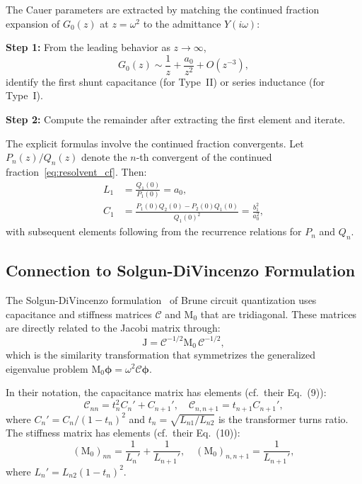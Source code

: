 \documentclass[reprint, floatfix, superscriptaddress, amsmath, amssymb, longbibliography]{revtex4-2}
\begin{document}
The Cauer parameters are extracted by matching the continued fraction expansion of $G_0(z)$ at $z = \omega^2$ to the admittance $Y(i\omega)$:

\textbf{Step 1:} From the leading behavior as $z \to \infty$,
\begin{equation}
G_0(z) \sim \frac{1}{z} + \frac{a_0}{z^2} + O(z^{-3}),
\label{eq:G_asymptotic}
\end{equation}
identify the first shunt capacitance (for Type~II) or series inductance (for Type~I).

\textbf{Step 2:} Compute the remainder after extracting the first element and iterate.

The explicit formulas involve the continued fraction convergents. Let $P_n(z)/Q_n(z)$ denote the $n$-th convergent of the continued fraction~\eqref{eq:resolvent_cf}. Then:
\begin{align}
L_1 &= \frac{Q_1(0)}{P_1(0)} = a_0, \label{eq:L1_from_jacobi} \\
C_1 &= \frac{P_1(0) Q_2(0) - P_2(0) Q_1(0)}{Q_1(0)^2} = \frac{b_1^2}{a_0^2}, \label{eq:C1_from_jacobi}
\end{align}
with subsequent elements following from the recurrence relations for $P_n$ and $Q_n$.

\subsection{Connection to Solgun-DiVincenzo Formulation}
\label{app:sd_connection}

The Solgun-DiVincenzo formulation~\cite{Solgun2014, Solgun2015} of Brune circuit quantization uses capacitance and stiffness matrices $\mathcal{C}$ and $\mathrm{M}_0$ that are tridiagonal. These matrices are directly related to the Jacobi matrix through:
\begin{equation}
\mathrm{J} = \mathcal{C}^{-1/2} \mathrm{M}_0 \, \mathcal{C}^{-1/2},
\label{eq:jacobi_from_sd}
\end{equation}
which is the similarity transformation that symmetrizes the generalized eigenvalue problem $\mathrm{M}_0 \boldsymbol{\phi} = \omega^2 \mathcal{C} \boldsymbol{\phi}$.

In their notation, the capacitance matrix has elements (cf.\ their Eq.~(9)):
\begin{equation}
\mathcal{C}_{nn} = t_n^2 C_n' + C_{n+1}', \quad \mathcal{C}_{n,n+1} = t_{n+1} C_{n+1}',
\label{eq:sd_capacitance}
\end{equation}
where $C_n' = C_n/(1-t_n)^2$ and $t_n = \sqrt{L_{n1}/L_{n2}}$ is the transformer turns ratio. The stiffness matrix has elements (cf.\ their Eq.~(10)):
\begin{equation}
(\mathrm{M}_0)_{nn} = \frac{1}{L_n'} + \frac{1}{L_{n+1}'}, \quad (\mathrm{M}_0)_{n,n+1} = \frac{1}{L_{n+1}'},
\label{eq:sd_stiffness}
\end{equation}
where $L_n' = L_{n2}(1-t_n)^2$.
\end{document}
